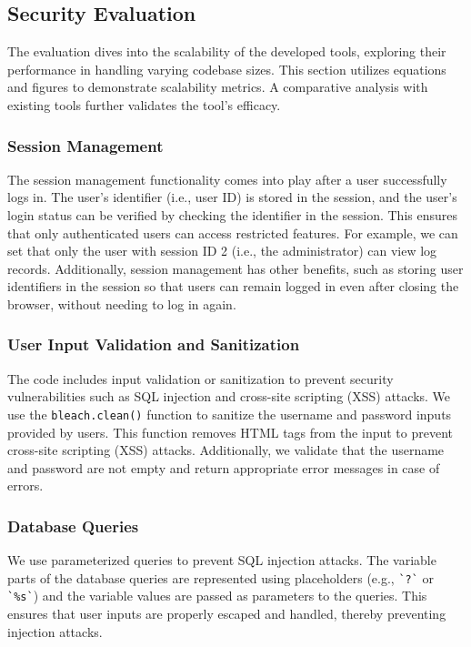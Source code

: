 \documentclass[journal]{IEEEtran}
\begin{document}
\subsection{Security Evaluation}
The evaluation dives into the scalability of the developed tools, exploring their performance in handling varying codebase sizes. This section utilizes equations and figures to demonstrate scalability metrics. A comparative analysis with existing tools further validates the tool's efficacy.

\subsubsection{Session Management}
The session management functionality comes into play after a user successfully logs in. The user's identifier (i.e., user ID) is stored in the session, and the user's login status can be verified by checking the identifier in the session. This ensures that only authenticated users can access restricted features. For example, we can set that only the user with session ID 2 (i.e., the administrator) can view log records. Additionally, session management has other benefits, such as storing user identifiers in the session so that users can remain logged in even after closing the browser, without needing to log in again.

\subsubsection{User Input Validation and Sanitization}
The code includes input validation or sanitization to prevent security vulnerabilities such as SQL injection and cross-site scripting (XSS) attacks. We use the \verb|bleach.clean()| function to sanitize the username and password inputs provided by users. This function removes HTML tags from the input to prevent cross-site scripting (XSS) attacks. Additionally, we validate that the username and password are not empty and return appropriate error messages in case of errors.

\subsubsection{Database Queries}
We use parameterized queries to prevent SQL injection attacks. The variable parts of the database queries are represented using placeholders (e.g., \verb|`?`| or \verb|`%s`|) and the variable values are passed as parameters to the queries. This ensures that user inputs are properly escaped and handled, thereby preventing injection attacks.
\end{document}

